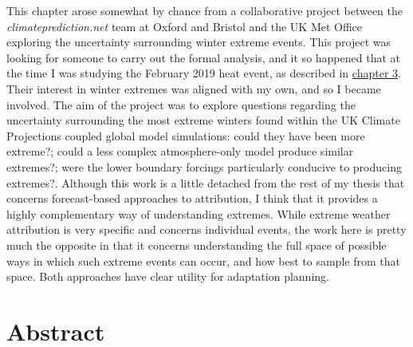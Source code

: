   This chapter arose somewhat by chance from a collaborative project between the \emph{climateprediction.net} team at Oxford and Bristol and the UK Met Office exploring the uncertainty surrounding winter extreme events. This project was looking for someone to carry out the formal analysis, and it so happened that at the time I was studying the February 2019 heat event, as described in \hyperref[ch3]{chapter 3}. Their interest in winter extremes was aligned with my own, and so I became involved. The aim of the project was to explore questions regarding the uncertainty surrounding the most extreme winters found within the UK Climate Projections coupled global model simulations: could they have been more extreme?; could a less complex atmosphere-only model produce similar extremes?; were the lower boundary forcings particularly conducive to producing extremes?. Although this work is a little detached from the rest of my thesis that concerns forecast-based approaches to attribution, I think that it provides a highly complementary way of understanding extremes. While extreme weather attribution is very specific and concerns individual events, the work here is pretty much the opposite in that it concerns understanding the full space of possible ways in which such extreme events can occur, and how best to sample from that space. Both approaches have clear utility for adaptation planning.

\section{Abstract}\label{ch5:abstract}

